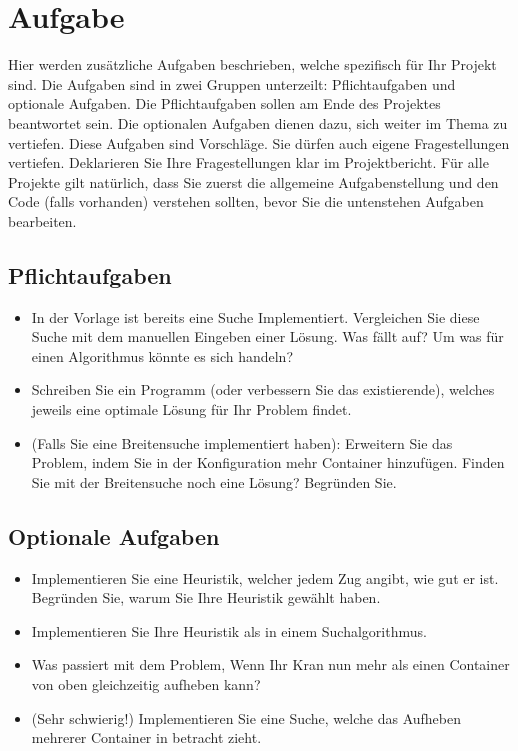 \documentclass[a4paper,11pt,german,notitlepage]{report}
\begin{document}
\section*{Aufgabe}
Hier werden zusätzliche Aufgaben beschrieben, welche spezifisch für Ihr Projekt sind.
Die Aufgaben sind in zwei Gruppen unterzeilt: Pflichtaufgaben und optionale Aufgaben.
Die Pflichtaufgaben sollen am Ende des Projektes beantwortet sein.
Die optionalen Aufgaben dienen dazu, sich weiter im Thema zu vertiefen.
Diese Aufgaben sind Vorschläge. Sie dürfen auch eigene Fragestellungen vertiefen.
Deklarieren Sie Ihre Fragestellungen klar im Projektbericht.
Für alle Projekte gilt natürlich, dass Sie zuerst die allgemeine Aufgabenstellung und den Code (falls vorhanden) verstehen sollten, bevor Sie die untenstehen Aufgaben bearbeiten.
\subsection*{Pflichtaufgaben}
\begin{itemize}
    \item In der Vorlage ist bereits eine Suche Implementiert. Vergleichen Sie diese Suche mit dem manuellen Eingeben einer Lösung. Was fällt auf? Um was für einen Algorithmus könnte es sich handeln?
    \item Schreiben Sie ein Programm (oder verbessern Sie das existierende), welches jeweils eine optimale Lösung für Ihr Problem findet.
    \item (Falls Sie eine Breitensuche implementiert haben): Erweitern Sie das Problem, indem Sie in der Konfiguration mehr Container hinzufügen. Finden Sie mit der Breitensuche noch eine Lösung? Begründen Sie.
\end{itemize}
\subsection*{Optionale Aufgaben}
\begin{itemize}
    \item Implementieren Sie eine Heuristik, welcher jedem Zug angibt, wie gut er ist. Begründen Sie, warum Sie Ihre Heuristik gewählt haben.
    \item Implementieren Sie Ihre Heuristik als in einem Suchalgorithmus.
    \item Was passiert mit dem Problem, Wenn Ihr Kran nun mehr als einen Container von oben gleichzeitig aufheben kann?
    \item (Sehr schwierig!) Implementieren Sie eine Suche, welche das Aufheben mehrerer Container in betracht zieht.
\end{itemize}
\end{document}
